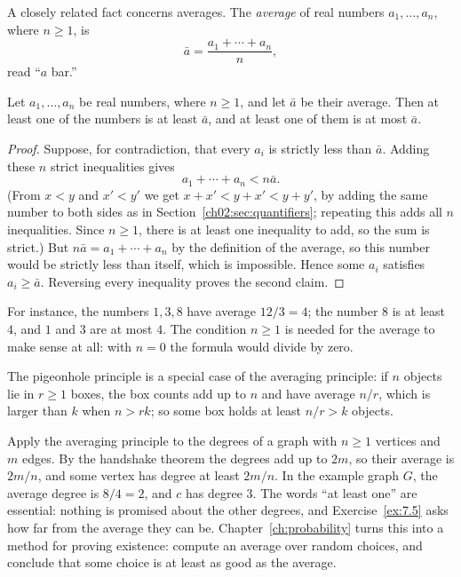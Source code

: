 A closely related fact concerns averages. The \emph{average} of real numbers $a_1,\ldots,a_n$, where $n\ge1$, is
\[
\bar a=\frac{a_1+\cdots+a_n}{n},
\]
read ``$a$ bar.''

\par\noindent\begin{minipage}{\linewidth}
\begin{proposition}\label{ch07:prop:average}
Let $a_1,\ldots,a_n$ be real numbers, where $n\ge1$, and let $\bar a$ be their average. Then at least one of the numbers is at least $\bar a$, and at least one of them is at most $\bar a$.
\end{proposition}
\end{minipage}\par

\begin{proof}
Suppose, for contradiction, that every $a_i$ is strictly less than $\bar a$. Adding these $n$ strict inequalities gives
\[
a_1+\cdots+a_n<n\bar a.
\]
(From $x<y$ and $x'<y'$ we get $x+x'<y+x'<y+y'$, by adding the same number to both sides as in Section~\ref{ch02:sec:quantifiers}; repeating this adds all $n$ inequalities. Since $n\ge1$, there is at least one inequality to add, so the sum is strict.) But $n\bar a=a_1+\cdots+a_n$ by the definition of the average, so this number would be strictly less than itself, which is impossible. Hence some $a_i$ satisfies $a_i\ge\bar a$. Reversing every inequality proves the second claim.
\end{proof}

For instance, the numbers $1,3,8$ have average $12/3=4$; the number $8$ is at least $4$, and $1$ and $3$ are at most $4$. The condition $n\ge1$ is needed for the average to make sense at all: with $n=0$ the formula would divide by zero.

The pigeonhole principle is a special case of the averaging principle: if $n$ objects lie in $r\ge1$ boxes, the box counts add up to $n$ and have average $n/r$, which is larger than $k$ when $n>rk$; so some box holds at least $n/r>k$ objects.

Apply the averaging principle to the degrees of a graph with $n\ge1$ vertices and $m$ edges. By the handshake theorem the degrees add up to $2m$, so their average is $2m/n$, and some vertex has degree at least $2m/n$. In the example graph $G$, the average degree is $8/4=2$, and $c$ has degree $3$. The words ``at least one'' are essential: nothing is promised about the other degrees, and Exercise~\ref{ex:7.5} asks how far from the average they can be. Chapter~\ref{ch:probability} turns this into a method for proving existence: compute an average over random choices, and conclude that some choice is at least as good as the average.
